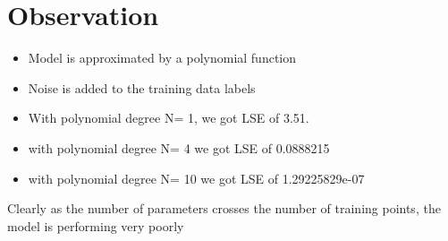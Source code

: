 \documentclass[journal,12pt,twocolumn]{IEEEtran}
\begin{document}
\section{Observation}
\begin{itemize}
  \item Model is approximated by a polynomial function
  \item Noise is added to the training data labels
  \item With polynomial degree N= 1, we got LSE of 3.51.
  \item with polynomial degree N= 4 we got LSE of 0.0888215
  \item with polynomial degree N= 10 we got LSE of 1.29225829e-07
\end{itemize}
Clearly as the number of parameters crosses the number of training points, the model is performing very poorly
\end{document}
